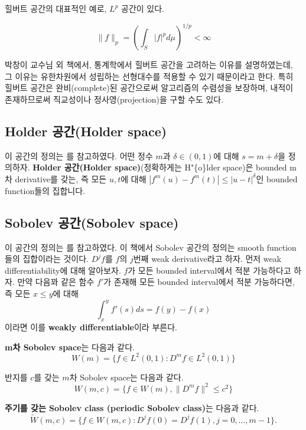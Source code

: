 \documentclass[b5paper,]{scrbook}
\theoremstyle{plain}
\theoremstyle{definition}
\numberwithin{equation}{section}
\let\BeginKnitrBlock\begin \let\EndKnitrBlock\end
\begin{document}
힐버트 공간의 대표적인 예로, \(L^{p}\) 공간이 있다.

\[\| f\|_{p}=(\int_{S}|f|^{p}d\mu)^{1/p}<\infty\]

박창이 교수님 외 책에서, 통계학에서 힐버트 공간을 고려하는 이유를
설명하였는데, 그 이유는 유한차원에서 성립하는 선형대수를 적용할 수 있기
때문이라고 한다. 특히 힐버트 공간은 완비(complete)된 공간으로써
알고리즘의 수렴성을 보장하며, 내적이 존재하므로써 직교성이나
정사영(projection)을 구할 수도 있다.

\subsection{Holder 공간(Holder space)}\label{holder-holder-space}

이 공간의 정의는 \citep{Wasserman2006}를 참고하였다. 어떤 정수 \(m\)과
\(\delta \in (0,1)\)에 대해 \(s=m+\delta\)을 정의하자. \textbf{Holder
공간(Holder space)}(정확하게는 H"\{o\}lder space)은 bounded m차
derivative를 갖는, 즉 모든 \(u,t\)에 대해
\(|f^{m}(u)-f^{m}(t)|\leq |u-t|^{\delta}\)인 bounded function들의
집합니다.

\subsection{Sobolev 공간(Sobolev space)}\label{sobolev-sobolev-space}

이 공간의 정의는 \citep{Wasserman2006}를 참고하였다. 이 책에서 Sobolev
공간의 정의는 smooth function들의 집합이라는 것이다. \(D^{j}f\)를
\(f\)의 \(j\)번째 weak derivative라고 하자. 먼저 weak
differentiability에 대해 알아보자. \(f\)가 모든 bounded interval에서
적분 가능하다고 하자. 만약 다음꽈 같은 함수 \(f'\)가 존재해 모든 bounded
interval에서 적분 가능하다면, 즉 모든 \(x\leq y\)에 대해
\[\int_{x}^{y}f'(s)ds=f(y)-f(x)\] 이라면 이를 \textbf{weakly
differentiable}이라 부른다.

\BeginKnitrBlock{definition}[Sobolev 공간]
\protect\hypertarget{def:unnamed-chunk-18}{}{\label{def:unnamed-chunk-18}
{} }\textbf{m차 Sobolev space}는 다음과 같다.
\[W(m)=\{ f \in L^{2}(0,1): D^{m}f \in L^{2}(0,1)\}\]

반지를 \(c\)를 갖는 \(m\)차 Sobolev space는 다음과 같다.
\[W(m,c)=\{ f \in W(m), \| D^{m}f \|^{2} \leq c^{2}\}\]

\textbf{주기를 갖는 Sobolev class (periodic Sobolev class)}는 다음과
같다.
\[\tilde{W}(m,c)=\{ f \in W(m,c): D^{j}f(0)=D^{j}f(1), j=0,\ldots, m-1 \}.\]
\EndKnitrBlock{definition}
\end{document}
